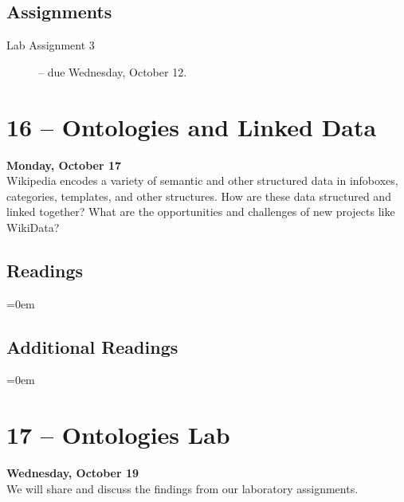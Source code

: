 \documentclass[10pt]{memoir}
\newenvironment{readinglist}{
\begin{list}{}{\leftmargin=8pt \itemindent=0em}
  \setlength{\itemsep}{8pt}
  \setlength{\parskip}{0em}
  \setlength{\parsep}{1em}
  \setlength{\parindent}{8em}}
{\end{list}}
\begin{document}
    \subsection{Assignments}
    \begin{description}%
        \item[Lab Assignment 3 ] -- due Wednesday, October 12. 
    \end{description}
    
\section{16 -- Ontologies and Linked Data}
\textcolor{CUGold}{\textbf{Monday, October 17}}\\
Wikipedia encodes a variety of semantic and other structured data in infoboxes, categories, templates, and other structures. How are these data structured and linked together? What are the opportunities and challenges of new projects like WikiData?

    \subsection{Readings}
    \begin{readinglist}
        \item {}
        \item {}
    \end{readinglist}
    
    \subsection{Additional Readings}
    \begin{readinglist}
        \item {}
        \item {}
        \item {}
        \item {}
        \item {}
    \end{readinglist}

\section{17 -- Ontologies Lab}
\textcolor{CUGold}{\textbf{Wednesday, October 19}}\\
We will share and discuss the findings from our laboratory assignments.
\end{document}
